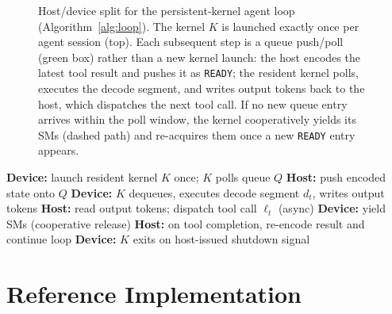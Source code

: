\documentclass{article}
\begin{document}
\begin{figure}[t]
\caption{Host/device split for the persistent-kernel agent loop
(Algorithm~\ref{alg:loop}). The kernel $K$ is launched exactly once
per agent session (top). Each subsequent step is a queue push/poll
(green box) rather than a new kernel launch: the host encodes the
latest tool result and pushes it as \texttt{READY}; the resident
kernel polls, executes the decode segment, and writes output tokens
back to the host, which dispatches the next tool call. If no new
queue entry arrives within the poll window, the kernel cooperatively
yields its SMs (dashed path) and re-acquires them once a new
\texttt{READY} entry appears.}
\label{fig:architecture}
\end{figure}

\begin{algorithm}[t]
\caption{Persistent-kernel agent loop}
\label{alg:loop}
\begin{algorithmic}[1]
\State \textbf{Device:} launch resident kernel $K$ once; $K$ polls queue $Q$
  \State \textbf{Host:} push encoded state onto $Q$
  \State \textbf{Device:} $K$ dequeues, executes decode segment $d_t$, writes output tokens
  \State \textbf{Host:} read output tokens; dispatch tool call $\ell_t$ (async)
    \State \textbf{Device:} yield SMs (cooperative release)
  \EndIf
  \State \textbf{Host:} on tool completion, re-encode result and continue loop
\EndFor
\State \textbf{Device:} $K$ exits on host-issued shutdown signal
\end{algorithmic}
\end{algorithm}

\section{Reference Implementation}
\label{sec:impl}
\end{document}
